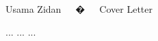\documentclass[11pt, a4paper]{awesome-cv}
\begin{document}
\makecvheader[R]
\makecvfooter
  {}
  {Usama Zidan~~~�~~~Cover Letter}
  {}

\makelettertitle

\begin{cvletter}

 ...
...
...
\end{cvletter}

\makeletterclosing
\end{document}
